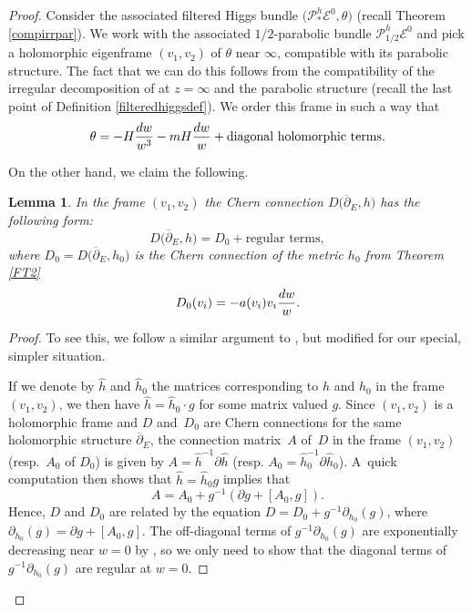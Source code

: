 \documentclass[11pt]{article}
\numberwithin{equation}{section}
\newtheorem{Lemma}[Theorem]{Lemma}
\numberwithin{equation}{section}
\begin{document}
\begin{proof}Consider the associated filtered Higgs bundle $\bigl(\mathcal{P}_*^h\mathcal{E}^{0},\theta\bigr)$ (recall Theorem \ref{compirrpar}). We work with the associated $1/2$-parabolic bundle $\mathcal{P}_{1/2}^h\mathcal{E}^{0}$ and pick a holomorphic eigenframe $(v_1,v_2)$ of $\theta$ near $\infty$, compatible with its parabolic structure. The fact that we can do this follows from the compatibility of the irregular decomposition of  at $z=\infty$ and the parabolic structure (recall the last point of Definition \ref{filteredhiggsdef}). We order this frame in such a way that
\begin{equation*}
\theta= -H\frac{{\rm d}w}{w^3}-mH\frac{{\rm d}w}{w}+\text{diagonal holomorphic terms.}
\end{equation*}

On the other hand, we claim the following.

\begin{Lemma}\label{connlem}
In the frame $(v_1,v_2)$ the Chern connection $D\bigl(\overline{\partial}_E,h\bigr)$ has the following form:
\begin{equation*}
 D\bigl(\overline{\partial}_E,h\bigr)=D_0 + \text{regular terms},
\end{equation*}
where $D_0=D\bigl(\overline{\partial}_E,h_0\bigr)$ is the Chern connection of the metric $h_0$ from Theorem {\rm\ref{FT2}}
\begin{equation*}
 D_0(v_i)=-a(v_i)v_i\frac{{\rm d}w}{w}.
\end{equation*}

\end{Lemma}
\begin{proof}
To see this, we follow a similar argument to \cite[Proposition 10.3.3]{M}, but modified for our special, simpler situation.

If we denote by $\hat{h}$ and $\hat{h}_0$ the matrices corresponding to $h$ and $h_0$ in the frame $(v_1,v_2)$, we then have $\hat{h}=\hat{h}_0\cdot g$ for some matrix valued $g$. Since $(v_1,v_2)$ is a holomorphic frame and $D$ and~$D_0$ are Chern connections for the same holomorphic structure $\overline{\partial}_E$, the connection matrix~$A$ of~$D$ in the frame $(v_1,v_2)$ (resp.\ $A_0$ of $D_0$) is given by
$A=\hat{h}^{-1}\partial \hat{h}$ (resp. $A_0=\hat{h}_0^{-1}\partial \hat{h}_0$).
A~quick computation then shows that $\hat{h}=\hat{h}_0g$ implies that
\begin{equation*}
 A=A_0+g^{-1}(\partial g +[A_0,g]).
\end{equation*}
Hence, $D$ and $D_0$ are related by the equation $D=D_0 +g^{-1}\partial_{h_0}(g)$, where ${\partial_{h_0}(g)=\partial g+[A_0,g]}$. The off-diagonal terms of $g^{-1}\partial_{h_0}(g)$ are exponentially decreasing near $w=0$ by \cite[Lem\-ma~10.1.3]{M}, so we only need to show that the diagonal terms of $g^{-1}\partial_{h_0}(g)$ are regular at $w=0$.


\end{proof}
\end{proof}
\end{document}
